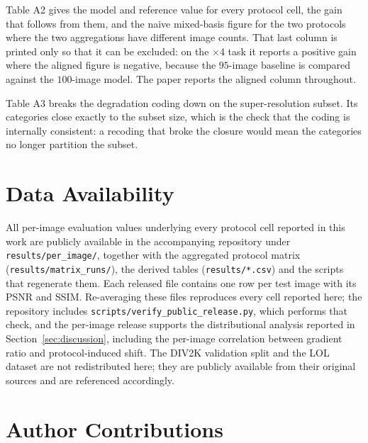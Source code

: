 \documentclass[10pt,twocolumn]{article}
\begin{document}


Table A2 gives the model and reference value for every protocol cell, the
gain that follows from them, and the naive mixed-basis figure for the two
protocols where the two aggregations have different image counts. That last
column is printed only so that it can be excluded: on the $\times$4 task it
reports a positive gain where the aligned figure is negative, because the
$95$-image baseline is compared against the $100$-image model. The paper
reports the aligned column throughout.



Table A3 breaks the degradation coding down on the super-resolution subset.
Its categories close exactly to the subset size, which is the check that the
coding is internally consistent: a recoding that broke the closure would
mean the categories no longer partition the subset.



\section*{Data Availability}

All per-image evaluation values underlying every protocol cell reported in
this work are publicly available in the accompanying repository under
\texttt{results/per\_image/}, together with the aggregated protocol matrix
(\texttt{results/matrix\_runs/}), the derived tables (\texttt{results/*.csv})
and the scripts that regenerate them. Each released file contains one row
per test image with its PSNR and SSIM. Re-averaging these files reproduces
every cell reported here; the repository includes
\texttt{scripts/verify\_public\_release.py}, which performs that check, and
the per-image release supports the distributional analysis reported in
Section~\ref{sec:discussion}, including the per-image correlation between
gradient ratio and protocol-induced shift. The DIV2K validation split and
the LOL dataset are not redistributed here; they are publicly available from
their original sources and are referenced accordingly.

\section*{Author Contributions}
\end{document}
